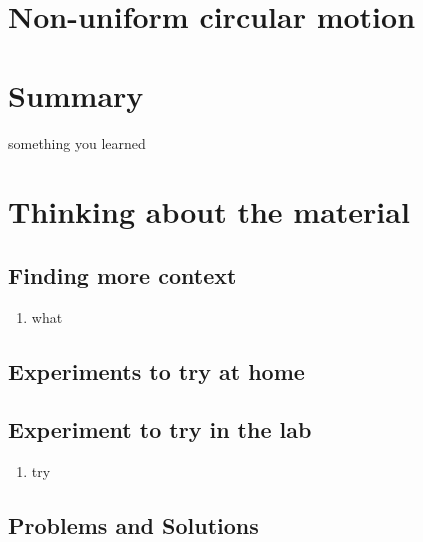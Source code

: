 \section{Non-uniform circular motion}











\newpage
\section{Summary}
\vspace{1cm}
\begin{chapterSummary}
\item something you learned
\end{chapterSummary}


\section{Thinking about the material}

\subsection{Finding more context}
\begin{enumerate}
\item what
\end{enumerate}

\subsection{Experiments to try at home}

\subsection{Experiment to try in the lab}
\begin{enumerate}
\item try
\end{enumerate}

\subsection{Problems and Solutions}
 
